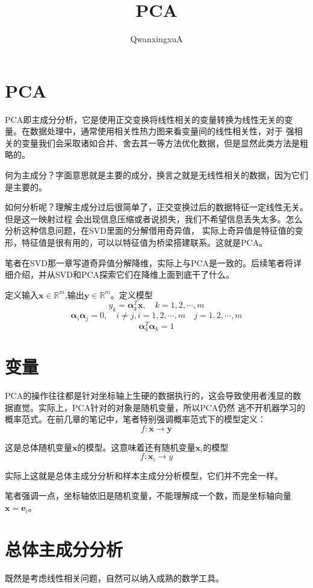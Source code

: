 \documentclass{article}
\title{PCA}
\author{QwanxingxuA}
\begin{document}
\maketitle
    \section{PCA}
    PCA即主成分分析，它是使用正交变换将线性相关的变量转换为线性无关的变量。在数据处理中，通常使用相关性热力图来看变量间的线性相关性，对于
    强相关的变量我们会采取诸如合并、舍去其一等方法优化数据，但是显然此类方法是粗略的。

    何为主成分？字面意思就是主要的成分，换言之就是无线性相关的数据，因为它们是主要的。

    如何分析呢？理解主成分过后很简单了，正交变换过后的数据特征一定线性无关。但是这一映射过程
    会出现信息压缩或者说损失，我们不希望信息丢失太多。怎么分析这种信息问题，在SVD里面的分解借用奇异值，
    实际上奇异值是特征值的变形，特征值是很有用的，可以以特征值为桥梁搭建联系。这就是PCA。
    
    笔者在SVD那一章写道奇异值分解降维，实际上与PCA是一致的。后续笔者将详细介绍，并从SVD和PCA探索它们在降维上面到底干了什么。

    定义输入$\boldsymbol{x}\in\mathbb{R}^m$,输出$\boldsymbol{y}\in\mathbb{R}^m$。定义模型
    \[y_k=\boldsymbol{\alpha}_k^T\boldsymbol{x},\quad k=1,2,\cdots,m\]
    \[\boldsymbol{\alpha}_i\boldsymbol{\alpha}_j=0,\quad i\neq j,i=1,2,\cdots,m\quad j=1,2,\cdots,m\]
    \[\boldsymbol{\alpha}_k^T\boldsymbol{\alpha}_k=1\]
    
    \section{变量}
    PCA的操作往往都是针对坐标轴上生硬的数据执行的，这会导致使用者浅显的数据直觉。实际上，PCA针对的对象是随机变量，所以PCA仍然
    逃不开机器学习的概率范式。在前几章的笔记中，笔者特别强调概率范式下的模型定义：
    \[f:\boldsymbol{x}\rightarrow \boldsymbol{y}\]

    这是总体随机变量$\boldsymbol{x}$的模型。这意味着还有随机变量$\boldsymbol{x}_i$的模型
    \[f:\boldsymbol{x}_i\rightarrow y\]

    实际上这就是总体主成分分析和样本主成分分析模型，它们并不完全一样。

    笔者强调一点，坐标轴依旧是随机变量，不能理解成一个数，而是坐标轴向量$\boldsymbol{x}=\boldsymbol{e}_i$。

    \section{总体主成分分析}
    既然是考虑线性相关问题，自然可以纳入成熟的数学工具。
\end{document}
